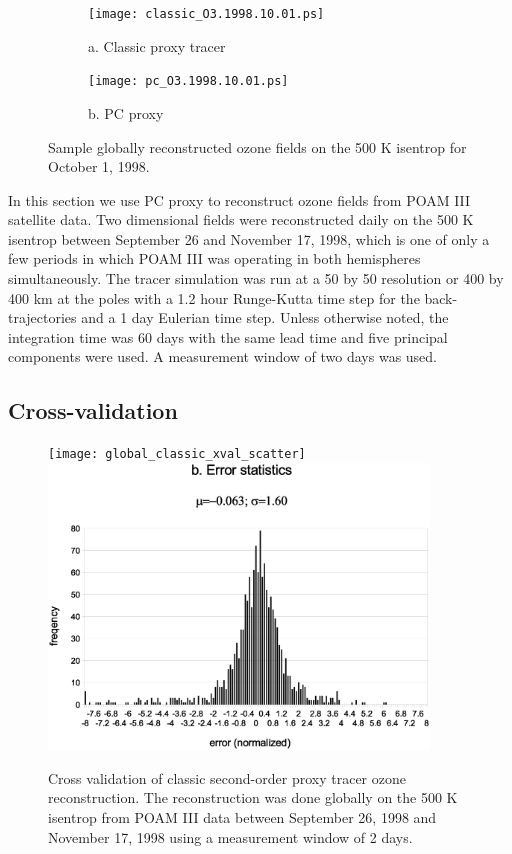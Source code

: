 \documentclass{article}
\begin{document}
\begin{figure}
  \begin{subfigure}{0.9\textwidth}
    \texttt{[image: classic\_O3.1998.10.01.ps]}
    \caption{a. Classic proxy tracer}
  \end{subfigure}
  \begin{subfigure}{0.9\textwidth}
    \texttt{[image: pc\_O3.1998.10.01.ps]}
    \caption{b. PC proxy\newline}
  \end{subfigure}
  \caption{Sample globally reconstructed ozone fields on the 500 K isentrop for October 1, 1998.}
\end{figure}

In this section we use PC proxy to reconstruct ozone fields from POAM III
satellite data.
Two dimensional fields were reconstructed daily on the 500 K isentrop
between September 26 and November 17, 1998,
which is one of only a few periods in which POAM III was operating in both 
hemispheres simultaneously.
The tracer simulation was run at a 50 by 50 resolution or 400 by 400 km at
the poles with a 1.2 hour Runge-Kutta time step for the back-trajectories
and a 1 day Eulerian time step.
Unless otherwise noted, the integration time was 60 days with the same lead time
and five principal components were used.
A measurement window of two days was used.

\subsection{Cross-validation}

\label{cross_validation}

\begin{figure}
  \centering
  \texttt{[image: global\_classic\_xval\_scatter]}
  \includegraphics[width=0.9\textwidth]{global_classic_xval_error}
  \caption{Cross validation of classic second-order proxy tracer ozone reconstruction. The reconstruction was done globally on the 500 K isentrop from POAM III data between September 26, 1998 and November 17, 1998 using a measurement window of 2 days.}
  \label{classic_cross_validation}
\end{figure}
\end{document}

